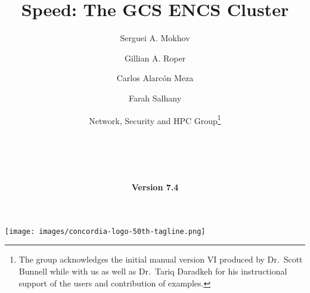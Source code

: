 \documentclass{easychair}
\begin{document}
%
\title{Speed: The GCS ENCS Cluster}



\date{\textbf{Version 7.4}}

\author{
    Serguei A. Mokhov
\and
    Gillian A. Roper
\and
    Carlos Alarcón Meza
\and
    Farah Salhany
\and
    Network, Security and HPC Group\footnote{The group acknowledges the initial manual version VI produced by Dr.~Scott Bunnell while with us
		as well as Dr.~Tariq Daradkeh for his instructional support of the users and contribution of examples.}\\
    \\
    \\
    \\
    \\
}

%

\maketitle

\begin{center}
    \texttt{[image: images/concordia-logo-50th-tagline.png]}
    \\[1em]
\end{center}
\end{document}
